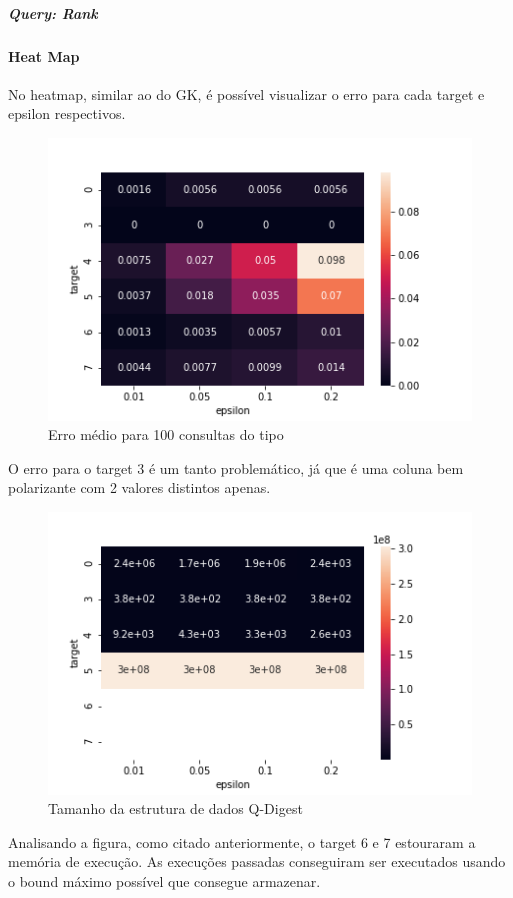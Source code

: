 \documentclass[11pt]{article}
\begin{document}
\subparagraph{\emph{Query: Rank}}
\paragraph{Heat Map}
No heatmap, similar ao do GK, é possível visualizar o erro para cada target e epsilon respectivos.

\begin{figure}[H]
  \centering
  \includegraphics[scale=0.5]{../../img/qdigest-heatmap_ERRO.png}
  \caption{Erro médio para 100 consultas do tipo}
\end{figure}
O erro para o target 3 é um tanto problemático, já que é uma coluna bem polarizante com 2 valores distintos apenas.

\begin{figure}[H]
  \centering
  \includegraphics[scale=0.5]{../../img/qdigest-heatmap_MEM.png}
  \caption{Tamanho da estrutura de dados Q-Digest}
\end{figure}

Analisando a figura, como citado anteriormente, o target 6 e 7 estouraram a memória de execução. As execuções passadas conseguiram ser executados usando o bound máximo possível que consegue armazenar.
\end{document}
